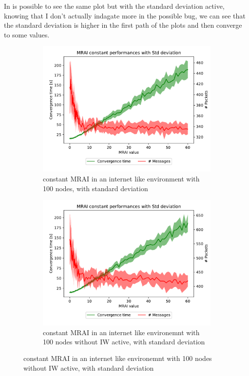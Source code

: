 \documentclass[10pt,conference,letterpaper]{IEEEtran}
\newcommand{\figwidth}{0.78}
\begin{document}
In  is possible to see the same plot but with
the standard deviation active, knowing that I don't actually indagate more in the
possible bug, we can see that the standard deviation is higher in the first
path of the plots and then converge to some values.

\begin{figure}[tb]
	\centering

	\begin{subfigure}{\columnwidth}
		\centering
		\includegraphics[width=\figwidth\columnwidth]{images/internet_like/S_AW/graph-100-constant/pareto-internet_like-constant_mrai_evolution_std_alpha.pdf}
		\caption{constant \ac{MRAI} in an internet like environment with \num{100} nodes, with standard deviation}
		\label{fig:s_aw_constant_mrai_IW_std}
		\qquad
	\end{subfigure}

	\begin{subfigure}{\columnwidth}
		\centering
		\includegraphics[width=\figwidth\columnwidth]{images/internet_like/S_AW/graph-100-constant-noIW/pareto-internet_like-constant-noIW_mrai_evolution_std_alpha.pdf}
		\caption{constant \ac{MRAI} in an internet like environemnt with \num{100} nodes without IW active, with standard deviation}
		\label{fig:s_aw_constant_mrai_noIW_std}
		\qquad
	\end{subfigure}


\end{figure}
\end{document}

